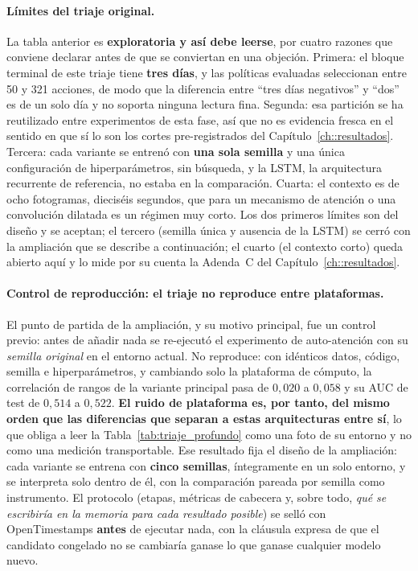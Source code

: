 \paragraph{Límites del triaje original.} La tabla anterior es \textbf{exploratoria y así
debe leerse}, por cuatro razones que conviene declarar antes de que se conviertan en una
objeción. Primera: el bloque terminal de este triaje tiene \textbf{tres días}, y las
políticas evaluadas seleccionan entre 50 y 321 acciones, de modo que la diferencia entre
``tres días negativos'' y ``dos'' es de un solo día y no soporta ninguna lectura fina.
Segunda: esa partición se ha reutilizado entre experimentos de esta fase, así que no es
evidencia fresca en el sentido en que sí lo son los cortes pre-registrados del
Capítulo~\ref{ch::resultados}. Tercera: cada variante se entrenó con \textbf{una sola
semilla} y una única configuración de hiperparámetros, sin búsqueda, y la LSTM, la
arquitectura recurrente de referencia, no estaba en la comparación. Cuarta: el contexto es
de ocho fotogramas, dieciséis segundos, que para un mecanismo de atención o una convolución
dilatada es un régimen muy corto. Los dos primeros límites son del diseño y se aceptan; el
tercero (semilla única y ausencia de la LSTM) se cerró con la ampliación que se describe a
continuación; el cuarto (el contexto corto) queda abierto aquí y lo mide por su cuenta la
Adenda~C del Capítulo~\ref{ch::resultados}.

\paragraph{Control de reproducción: el triaje no reproduce entre plataformas.}
\label{sec:ampliacion_triaje}
El punto de partida de la ampliación, y su motivo principal, fue un control previo: antes de
añadir nada se re-ejecutó el experimento de auto-atención con su \emph{semilla original} en
el entorno actual. No reproduce: con idénticos datos, código, semilla e hiperparámetros, y
cambiando solo la plataforma de cómputo, la correlación de rangos de la variante principal
pasa de $0{,}020$ a $0{,}058$ y su AUC de test de $0{,}514$ a $0{,}522$. \textbf{El ruido de
plataforma es, por tanto, del mismo orden que las diferencias que separan a estas
arquitecturas entre sí}, lo que obliga a leer la Tabla~\ref{tab:triaje_profundo} como una
foto de su entorno y no como una medición transportable. Ese resultado fija el diseño de la
ampliación: cada variante se entrena con \textbf{cinco semillas}, íntegramente en un solo
entorno, y se interpreta solo dentro de él, con la comparación pareada por semilla como
instrumento. El protocolo (etapas, métricas de cabecera y, sobre todo, \emph{qué se
escribiría en la memoria para cada resultado posible}) se selló con OpenTimestamps
\textbf{antes} de ejecutar nada, con la cláusula expresa de que el candidato congelado no se
cambiaría ganase lo que ganase cualquier modelo nuevo.

